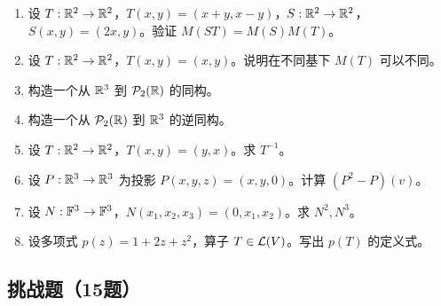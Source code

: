 \begin{enumerate}[label=\medium\ \arabic*., leftmargin=*, start=1]
$M(T)$。 \item 设 $T:\mathbb{R}^2\to\mathbb{R}^2$，$T(x,y)=(x+y,x-y)$，$S:\mathbb{R}^2\to\mathbb{R}^2$，$S(x,y)=(2x,y)$。验证
$M(ST)=M(S)M(T)$。 \item 设 $T:\mathbb{R}^2\to\mathbb{R}^2$，$T(x,y)=(x,y)$。说明在不同基下 $M(T)$ 可以不同。 \item
构造一个从 $\mathbb{R}^3$ 到 $\mathcal{P}_2(\mathbb{R})$ 的同构。 \item 构造一个从 $\mathcal{P}_2(\mathbb{R})$ 到 $\mathbb{R}^3$ 的逆同构。 \item 设
$T:\mathbb{R}^2\to\mathbb{R}^2$，$T(x,y)=(y,x)$。求 $T^{-1}$。 \item 设 $P:\mathbb{R}^3\to\mathbb{R}^3$ 为投影
$P(x,y,z)=(x,y,0)$。计算 $(P^2-P)(v)$。 \item 设
$N:\mathbb{F}^3\to\mathbb{F}^3$，$N(x_1,x_2,x_3)=(0,x_1,x_2)$。求 $N^2,N^3$。 \item 设多项式 $p(z)=1+2z+z^2$，算子
$T\in\mathcal{L}(V)$。写出 $p(T)$ 的定义式。 \end{enumerate}

\subsection*{挑战题（15题）}

